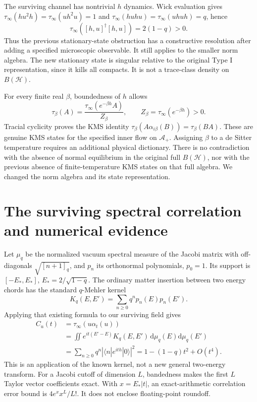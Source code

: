 \documentclass[11pt]{article}
\newcommand{\HH}{\mathcal H}
\newcommand{\Alg}{\mathcal A}
\newcommand{\dd}{\mathrm d}
\begin{document}
The surviving channel has nontrivial $h$ dynamics. Wick evaluation
gives $\tau_\infty(hu^2h)=\tau_\infty(uh^2u)=1$ and
$\tau_\infty(huhu)=\tau_\infty(uhuh)=q$, hence
\begin{equation}
 \tau_\infty([h,u]^\dagger[h,u])=2(1-q)>0.
\end{equation}
Thus the previous stationary-state obstruction has a constructive
resolution after adding a specified microscopic observable. It still
applies to the smaller norm algebra. The new stationary state is
singular relative to the original Type I representation, since it
kills all compacts. It is not a trace-class density on $B(\HH)$.

For every finite real $\beta$, boundedness of $h$ allows
\begin{equation}
 \tau_\beta(A)=\frac{\tau_\infty(e^{-\beta h}A)}{Z_\beta},
 \qquad Z_\beta=\tau_\infty(e^{-\beta h})>0.
\end{equation}
Tracial cyclicity proves the KMS identity
$\tau_\beta(A\alpha_{i\beta}(B))=\tau_\beta(BA)$.
These are genuine KMS states for the specified inner flow on
$\Alg_+$. Assigning $\beta$ to a de Sitter temperature requires an
additional physical dictionary. There is no contradiction with the
absence of normal equilibrium in the original full $B(\HH)$, nor with
the previous absence of finite-temperature KMS states on that full
algebra. We changed the norm algebra and its state representation.

\newpage
\section{The surviving spectral correlation and numerical evidence}
Let $\mu_q$ be the normalized vacuum spectral measure of the Jacobi
matrix with off-diagonals $\sqrt{[n+1]_q}$, and $p_n$ its orthonormal
polynomials, $p_0=1$. Its support is
$[-E_*,E_*]$, $E_*=2/\sqrt{1-q}$. The ordinary matter insertion between
two energy chords has the standard $q$-Mehler kernel
\begin{equation}
 K_q(E,E')=\sum_{n\ge0}q^n p_n(E)p_n(E').
\end{equation}
Applying that existing formula to our surviving field gives
\begin{align}
 C_u(t)&=\tau_\infty(u\alpha_t(u))\\
 &=\iint e^{it(E'-E)}K_q(E,E')\,\dd\mu_q(E)\dd\mu_q(E')\\
 &=\sum_{n\ge0}q^n\left|\langle n|e^{ith}|0\rangle\right|^2
   =1-(1-q)t^2+O(t^4).
\end{align}
This is an application of the known kernel, not a new general
two-energy transform. For a Jacobi cutoff of dimension $L$, bandedness
makes the first $L$ Taylor vector coefficients exact. With
$x=E_*|t|$, an exact-arithmetic correlation error bound is
$4e^x x^L/L!$. It does not enclose floating-point roundoff.
\end{document}
